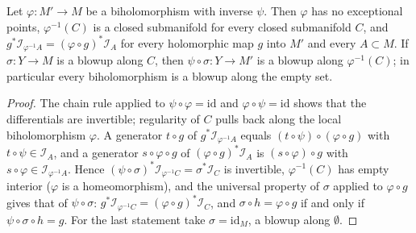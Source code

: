 \begin{lemma}
\label{hir:biholomorphism-blowup}
\leanok
Let \(\varphi\colon M'\to M\) be a biholomorphism with inverse \(\psi\). Then \(\varphi\) has no exceptional points, \(\varphi^{-1}(C)\) is a closed
submanifold for every closed submanifold \(C\), and \(g^*\mathcal I_{\varphi^{-1}A}=(\varphi\circ g)^*\mathcal I_A\) for every holomorphic map \(g\) into \(M'\) and every
\(A\subset M\). If \(\sigma\colon Y\to M\) is a blowup along \(C\), then \(\psi\circ\sigma\colon Y\to M'\) is a blowup along \(\varphi^{-1}(C)\); in particular every
biholomorphism is a blowup along the empty set.
\end{lemma}
\begin{proof}
\leanok
The chain rule applied to \(\psi\circ\varphi=\mathrm{id}\) and \(\varphi\circ\psi=\mathrm{id}\) shows that the differentials are invertible; regularity of \(C\) pulls back
along the local biholomorphism \(\varphi\). A generator \(t\circ g\) of \(g^*\mathcal I_{\varphi^{-1}A}\) equals \((t\circ\psi)\circ(\varphi\circ g)\) with
\(t\circ\psi\in\mathcal I_A\), and a generator \(s\circ\varphi\circ g\) of \((\varphi\circ g)^*\mathcal I_A\) is \((s\circ\varphi)\circ g\) with \(s\circ\varphi\in\mathcal I_{\varphi^{-1}A}\). Hence
\((\psi\circ\sigma)^*\mathcal I_{\varphi^{-1}C}=\sigma^*\mathcal I_C\) is invertible, \(\varphi^{-1}(C)\) has empty interior (\(\varphi\) is a homeomorphism), and the universal
property of \(\sigma\) applied to \(\varphi\circ g\) gives that of \(\psi\circ\sigma\): \(g^*\mathcal I_{\varphi^{-1}C}=(\varphi\circ g)^*\mathcal I_C\), and \(\sigma\circ h=\varphi\circ g\) if and only if
\(\psi\circ\sigma\circ h=g\). For the last statement take \(\sigma=\mathrm{id}_M\), a blowup along \(\emptyset\).
\end{proof}
